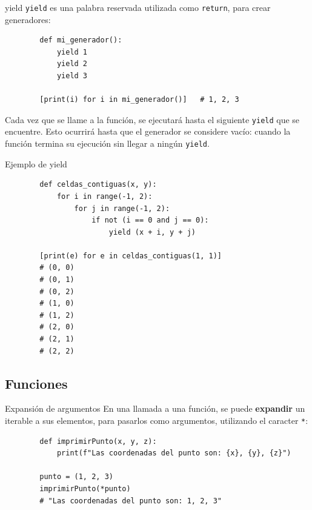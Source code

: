 \documentclass[10pt]{beamer} %
\begin{document}
\begin{frame}[fragile]{yield}
    \texttt{yield} es una palabra reservada utilizada como \texttt{return}, para crear generadores:
    \begin{verbatim}
        def mi_generador():
            yield 1
            yield 2
            yield 3
        
        [print(i) for i in mi_generador()]   # 1, 2, 3
    \end{verbatim}
    Cada vez que se llame a la función, se ejecutará hasta el siguiente \texttt{yield} que se encuentre. Esto ocurrirá hasta que el generador se considere vacío: cuando la función termina su ejecución sin llegar a ningún \texttt{yield}.
\end{frame}

\begin{frame}[fragile]{Ejemplo de yield}
    \begin{verbatim}
        def celdas_contiguas(x, y):
            for i in range(-1, 2):
                for j in range(-1, 2):
                    if not (i == 0 and j == 0):
                        yield (x + i, y + j)
        
        [print(e) for e in celdas_contiguas(1, 1)]
        # (0, 0)
        # (0, 1)
        # (0, 2)
        # (1, 0)
        # (1, 2)
        # (2, 0)
        # (2, 1)
        # (2, 2)
    \end{verbatim}
\end{frame}

\subsection{Funciones}

\begin{frame}[fragile]{Expansión de argumentos}
    En una llamada a una función, se puede \textbf{expandir} un iterable a sus elementos, para pasarlos como argumentos, utilizando el caracter \texttt{*}:
    \begin{verbatim}
        def imprimirPunto(x, y, z):
            print(f"Las coordenadas del punto son: {x}, {y}, {z}")
        
        punto = (1, 2, 3)
        imprimirPunto(*punto)
        # "Las coordenadas del punto son: 1, 2, 3"
    \end{verbatim}
\end{frame}
\end{document}
